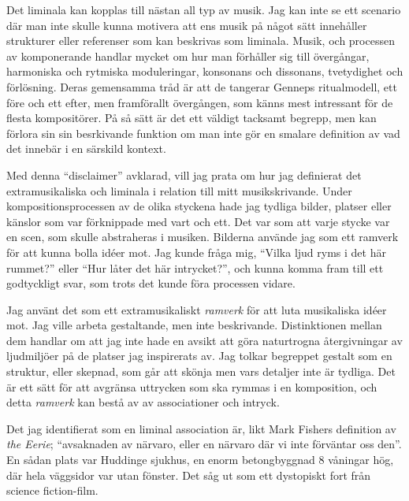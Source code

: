\documentclass{article}
\begin{document}
Det liminala kan kopplas till nästan all typ av musik. Jag kan inte se ett scenario där man inte skulle kunna
motivera att ens musik på något sätt innehåller strukturer eller referenser som kan beskrivas som liminala.
Musik, och processen av komponerande handlar mycket om hur man förhåller sig till övergångar, harmoniska och
rytmiska moduleringar, konsonans och dissonans, tvetydighet och förlösning. Deras gemensamma tråd är att de
tangerar Genneps ritualmodell, ett före och ett efter, men framförallt övergången, som känns mest intressant
för de flesta kompositörer. På så sätt är det ett väldigt tacksamt begrepp, men kan förlora sin sin
besrkivande funktion om man inte gör en smalare definition av vad det innebär i en särskild kontext.

Med denna ``disclaimer'' avklarad, vill jag prata om hur jag definierat det extramusikaliska och liminala i
relation till mitt musikskrivande. Under kompositionsprocessen av de olika styckena hade jag tydliga bilder,
platser eller känslor som var förknippade med vart och ett. Det var som att varje stycke var en scen, som
skulle abstraheras i musiken. Bilderna använde jag som ett ramverk för att kunna bolla idéer mot. Jag kunde
fråga mig, ``Vilka ljud ryms i det här rummet?'' eller ``Hur låter det här intrycket?'', och kunna komma fram
till ett godtyckligt svar, som trots det kunde föra processen vidare. 


Jag använt det som ett extramusikaliskt \emph{ramverk} för att luta musikaliska idéer mot. Jag ville arbeta
gestaltande, men inte beskrivande. Distinktionen mellan dem handlar om att jag inte hade en avsikt att göra
naturtrogna återgivningar av ljudmiljöer på de platser jag inspirerats av. Jag tolkar begreppet gestalt som en
struktur, eller skepnad, som går att skönja men vars detaljer inte är tydliga. Det är ett sätt för att
avgränsa uttrycken som ska rymmas i en komposition, och detta \emph{ramverk} kan bestå av av associationer och
intryck. 

Det jag identifierat som en liminal association är, likt Mark Fishers definition av \emph{the Eerie};
``avsaknaden av närvaro, eller en närvaro där vi inte förväntar oss den''. En sådan plats var Huddinge sjukhus,
en enorm betongbyggnad 8 våningar hög, där hela väggsidor var utan fönster. Det såg ut som ett dystopiskt fort
från science fiction-film.
\end{document}
